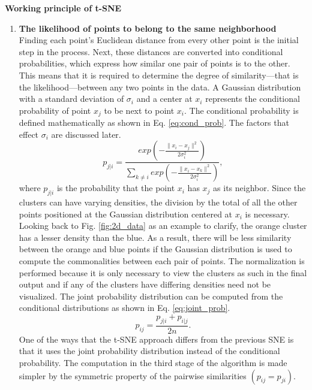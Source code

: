 \vspace{5mm}

\textbf{Working principle of \ac{t-SNE}}\\
\begin{enumerate}
    \item \textbf{The likelihood of points to belong to the same neighborhood}\\
    Finding each point's Euclidean distance from every other point is the initial step in the process. Next, these distances are converted into conditional probabilities, which express how similar one pair of points is to the other. This means that it is required to determine the degree of similarity—that is the likelihood—between any two points in the data. A Gaussian distribution with a standard deviation of $\sigma_i$ and a center at $x_i$ represents the conditional probability of point $x_j$ to be next to point $x_i$. The conditional probability is defined mathematically as shown in Eq. \ref{eq:cond_prob}. The factors that effect $\sigma_i$ are discussed later.
    \begin{equation}
        \label{eq:cond_prob}
        \mathit{p_{j|i}} = \mathit{\frac{exp \left(- \frac{\lVert x_i - x_j \rVert ^2}{2 \sigma_i^2} \right)}{\sum_{k \neq i} exp \left(- \frac{\lVert x_i - x_k \rVert ^2}{2 \sigma_i^2} \right)}}, 
    \end{equation}
    where $p_{j|i}$ is the probability that the point $x_i$ has $x_j$ as its neighbor. Since the clusters can have varying densities, the division by the total of all the other points positioned at the Gaussian distribution centered at $x_i$ is necessary. Looking back to Fig. \ref{fig:2d_data} as an example to clarify, the orange cluster has a lesser density than the blue. As a result, there will be less similarity between the orange and blue points if the Gaussian distribution is used to compute the commonalities between each pair of points. The normalization is performed because it is only necessary to view the clusters as such in the final output and if any of the clusters have differing densities need not be visualized. The joint probability distribution can be computed from the conditional distributions as shown in Eq. \ref{eq:joint_prob}.\cite{van2008visualizing}
    \begin{equation}
        \label{eq:joint_prob}
        \mathit{p_{ij}} = \mathit{\frac{p_{j|i} + p_{i|j}}{2n}}. 
    \end{equation}
    One of the ways that the t-SNE approach differs from the previous SNE is that it uses the joint probability distribution instead of the conditional probability. The computation in the third stage of the algorithm is made simpler by the symmetric property of the pairwise similarities $(p_{ij} = p_{ji})$.

\end{enumerate}
